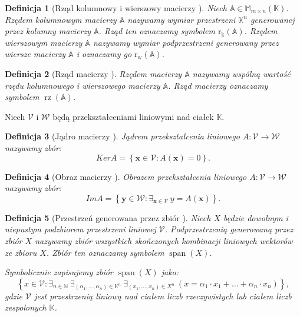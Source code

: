 \documentclass[12pt,a4paper]{report}
\newtheorem{df}{Definicja}[chapter]
\newcommand{\set}[1]{\left\lbrace {#1} \right\rbrace}
\newcommand{\setK}{\mathbb{K}}
\newcommand{\setN}{\mathbb{N}}
\newcommand{\przestrzen}[1]{\operatorname{span}\left({#1} \right)}
\newcommand{\rw}[1]{\operatorname{r_w}\left({#1} \right)}
\newcommand{\rk}[1]{\operatorname{r_k}\left({#1} \right)}
\newcommand{\rz}[1]{\operatorname{rz}\left({#1} \right)}
\begin{document}
\begin{df}[Rząd kolumnowy i wierszowy macierzy {\citep[Sec 8.1]{alzega}}]
Niech $\mathbb{A} \in \mathbb{M}_{m\times n}(\setK)$. Rzędem kolumnowym macierzy $\mathbb{A}$ nazywamy wymiar przestrzeni $\setK^n$ generowanej przez kolumny macierzy $\mathbb{A}$. Rząd ten oznaczamy symbolem $\rk{\mathbb{A}}$. Rzędem wierszowym macierzy $\mathbb{A}$ nazywamy wymiar podprzestrzeni generowany przez wiersze macierzy $\mathbb{A}$ i oznaczamy go $\rw{\mathbb{A}}$.
\end{df}

\begin{df}[Rząd macierzy {\citep[Sec 8.1]{alzega}}]
Rzędem macierzy $\mathbb{A}$ nazywamy wspólną wartość rzędu kolumnowego i wierszowego macierzy $\mathbb{A}$. Rząd macierzy oznaczamy symbolem $\rz{\mathbb{A}}$.
\end{df}

Niech $\mathcal{V}$ i $\mathcal{W}$ będą przekształceniami liniowymi nad ciałek $\setK$.
\begin{df}[Jądro macierzy {\citep[Sec 8.1]{alzega}}]
Jądrem przekształcenia liniowego $A: \mathcal{V}\to \mathcal{W}$ nazywamy zbór:
$$
Ker A = \set{ \mathbf{x} \in \mathcal{V} : A(\mathbf{x}) = 0}.
$$
\end{df}

\begin{df}[Obraz macierzy {\citep[Sec 8.1]{alzega}}]
Obrazem przekształcenia liniowego $A: \mathcal{V}\to \mathcal{W}$ nazywamy zbór:
$$
Im A = \set{ \mathbf{y} \in \mathcal{W} : \exists_{\mathbf{x} \in \mathcal{V}} \: y = A(\mathbf{x})}.
$$
\end{df}

\begin{df}[Przestrzeń generowana przez zbiór {\citep[Sec 7.1 Def 7.13]{alzega}}]
Niech $\mathit{X}$ będzie dowolnym i niepustym podzbiorem przestrzeni liniowej $\mathcal{V}$. Podprzestrzenią generowaną przez zbiór $\mathit{X}$ nazywamy zbiór wszystkich  skończonych kombinacji liniowych wektorów ze zbioru $\mathit{X}$. Zbiór ten oznaczamy symbolem $\przestrzen{\mathit{X}}$.

Symbolicznie zapisujemy zbiór $\przestrzen{\mathit{X}}$ jako:
$$
\set{x \in \mathcal{V} : \exists_{n \in \setN} \: \exists_{(\alpha_1, \ldots, \alpha_n) \in \setK^n } \: \exists_{(x_1, \ldots, x_n) \in \mathit{X}^n} \: (x = \alpha_1 \cdot x_1 + \ldots + \alpha_n \cdot x_n)},
$$
gdzie $\mathcal{V}$ jest przestrzenią liniową nad ciałem liczb rzeczywistych lub ciałem liczb zespolonych $\setK$.
\end{df}
\end{document}
